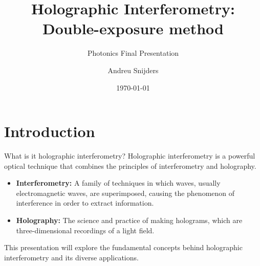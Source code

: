 \documentclass{beamer}
\title{Holographic Interferometry: Double-exposure method}
\subtitle{Photonics Final Presentation}
\author{Andreu Snijders}
\date{\today}
\begin{document}
\frame{\titlepage}

\section{Introduction}
\begin{frame}{What is it holographic interferometry?}
    Holographic interferometry is a powerful optical technique that combines the principles of interferometry and holography.
    \begin{itemize}
        \item \textbf{Interferometry:} A family of techniques in which waves, usually electromagnetic waves, are superimposed, causing the phenomenon of interference in order to extract information.
        \item \textbf{Holography:} The science and practice of making holograms, which are three-dimensional recordings of a light field.
    \end{itemize}
    This presentation will explore the fundamental concepts behind holographic interferometry and its diverse applications.
\end{frame}
\end{document}
